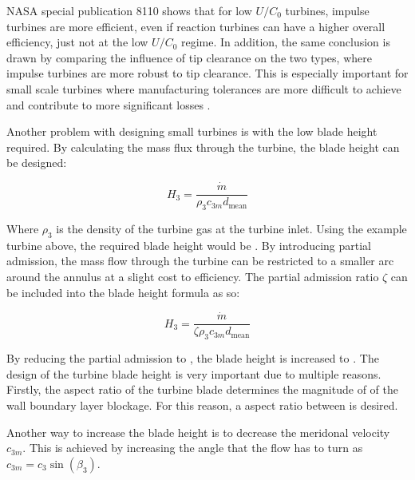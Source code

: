 NASA special publication 8110 shows that for low $U/C_0$ turbines, impulse turbines are more efficient, even if reaction turbines can have a higher overall efficiency, just not at the low $U/C_0$ regime. In addition, the same conclusion is drawn by comparing the influence of tip clearance on the two types, where impulse turbines are more robust to tip clearance. This is especially important for small scale turbines where manufacturing tolerances are more difficult to achieve and contribute to more significant losses \cite{NASASP8110}. 



Another problem with designing small turbines is with the low blade height required. By calculating the mass flux through the turbine, the blade height can be designed:

\begin{equation}
    H_3 = \frac{\dot{m}}{\rho_3 c_{3m} d_{\textrm{mean}}}
    \label{eq:turbine_blade_height_full_admission}
\end{equation}

Where $\rho_3$ is the density of the turbine gas at the turbine inlet. Using the example turbine above, the required blade height would be . By introducing partial admission, the mass flow through the turbine can be restricted to a smaller arc around the annulus at a slight cost to efficiency. The partial admission ratio $\zeta$ can be included into the blade height formula as so:

\begin{equation}
    H_3 = \frac{\dot{m}}{\zeta \rho_3 c_{3m} d_{\textrm{mean}}}
    \label{eq:turbine_blade_height}
\end{equation}

By reducing the partial admission to , the blade height is increased to . The design of the turbine blade height is very important due to multiple reasons. Firstly, the aspect ratio of the turbine blade determines the magnitude of of the wall boundary layer blockage. For this reason, a aspect ratio between  is desired.

Another way to increase the blade height is to decrease the meridonal velocity $c_{3m}$. This is achieved by increasing the angle that the flow has to turn as $c_{3m}=c_3\sin(\beta_3)$. 

